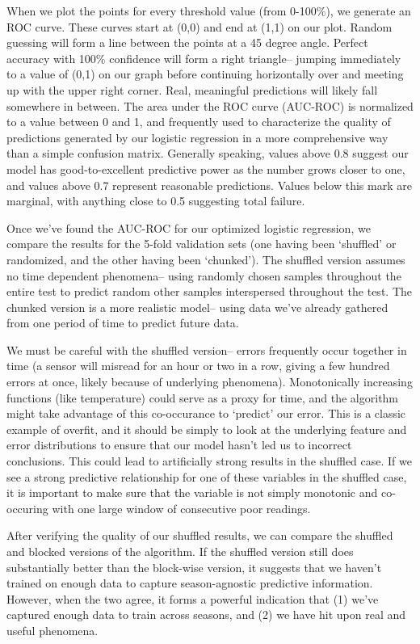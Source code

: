 When we plot the points for every threshold value (from 0-100\%), we generate an ROC curve.  These curves start at (0,0) and end at (1,1) on our plot.  Random guessing will form a line between the points at a 45 degree angle.  Perfect accuracy with 100\% confidence will form a right triangle-- jumping immediately to a value of (0,1) on our graph before continuing horizontally over and meeting up with the upper right corner.  Real, meaningful predictions will likely fall somewhere in between.  The area under the ROC curve (AUC-ROC) is normalized to a value between 0 and 1, and frequently used to characterize the quality of predictions generated by our logistic regression in a more comprehensive way than a simple confusion matrix.  Generally speaking, values above 0.8 suggest our model has good-to-excellent predictive power as the number grows closer to one, and values above 0.7 represent reasonable predictions.  Values below this mark are marginal, with anything close to 0.5 suggesting total failure.

Once we've found the AUC-ROC for our optimized logistic regression, we compare the results for the 5-fold validation sets (one having been `shuffled' or randomized, and the other having been `chunked').  The shuffled version assumes no time dependent phenomena-- using randomly chosen samples throughout the entire test to predict random other samples interspersed throughout the test.  The chunked version is a more realistic model-- using data we've already gathered from one period of time to predict future data.  

We must be careful with the shuffled version-- errors frequently occur together in time (a sensor will misread for an hour or two in a row, giving a few hundred errors at once, likely because of underlying phenomena).  Monotonically increasing functions (like temperature) could serve as a proxy for time, and the algorithm might take advantage of this co-occurance to `predict' our error.  This is a classic example of overfit, and it should be simply to look at the underlying feature and error distributions to ensure that our model hasn't led us to incorrect conclusions.  This could lead to artificially strong results in the shuffled case.  If we see a strong predictive relationship for one of these variables in the shuffled case, it is important to make sure that the variable is not simply monotonic and co-occuring with one large window of consecutive poor readings.  

After verifying the quality of our shuffled results, we can compare the shuffled and blocked versions of the algorithm.  If the shuffled version still does substantially better than the block-wise version, it suggests that we haven't trained on enough data to capture season-agnostic predictive information.  However, when the two agree, it forms a powerful indication that (1) we've captured enough data to train across seasons, and (2) we have hit upon real and useful phenomena.  
